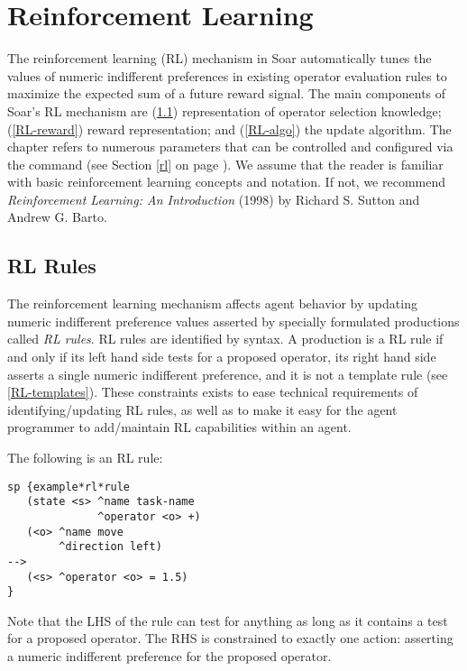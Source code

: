 \chapter{Reinforcement Learning}
\label{RL}

The reinforcement learning (RL) mechanism in Soar automatically tunes the values of numeric indifferent preferences in existing operator evaluation rules to maximize the expected sum of a future reward signal.
The main components of Soar's RL mechanism are (\ref{RL-rules}) representation of operator selection knowledge; (\ref{RL-reward}) reward representation; and (\ref{RL-algo}) the update algorithm. 
The chapter refers to numerous parameters that can be controlled and configured via the  command (see Section \ref{rl} on page \pageref{rl}).
We assume that the reader is familiar with basic reinforcement learning concepts and notation. If not, we recommend \emph{Reinforcement Learning: An Introduction} (1998) by Richard S. Sutton and Andrew G. Barto.

\section{RL Rules}
\label{RL-rules}

The reinforcement learning mechanism affects agent behavior by updating numeric indifferent preference values asserted by specially formulated productions called \emph{RL rules}.
RL rules are identified by syntax.
A production is a RL rule if and only if its left hand side tests for a proposed operator, its right hand side asserts a single numeric indifferent preference, and it is not a template rule (see \ref{RL-templates}).
These constraints exists to ease technical requirements of identifying/updating RL rules, as well as to make it easy for the agent programmer to add/maintain RL capabilities within an agent.

The following is an RL rule:

\begin{verbatim}
sp {example*rl*rule
   (state <s> ^name task-name
	          ^operator <o> +)
   (<o> ^name move
	    ^direction left)
-->
   (<s> ^operator <o> = 1.5)
}
\end{verbatim}

Note that the LHS of the rule can test for anything as long as it contains a test for a proposed operator.
The RHS is constrained to exactly one action: asserting a numeric indifferent preference for the proposed operator.

